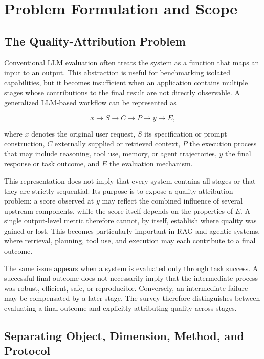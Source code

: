\section{Problem Formulation and Scope}
\label{sec:background}

\subsection{The Quality-Attribution Problem}

Conventional LLM evaluation often treats the system as a function that maps an input to an output. This abstraction is useful for benchmarking isolated capabilities, but it becomes insufficient when an application contains multiple stages whose contributions to the final result are not directly observable. A generalized LLM-based workflow can be represented as

\begin{equation}
x \rightarrow S \rightarrow C \rightarrow P \rightarrow y \rightarrow E,
\end{equation}

where $x$ denotes the original user request, $S$ its specification or prompt construction, $C$ externally supplied or retrieved context, $P$ the execution process that may include reasoning, tool use, memory, or agent trajectories, $y$ the final response or task outcome, and $E$ the evaluation mechanism.

This representation does not imply that every system contains all stages or that they are strictly sequential. Its purpose is to expose a quality-attribution problem: a score observed at $y$ may reflect the combined influence of several upstream components, while the score itself depends on the properties of $E$. A single output-level metric therefore cannot, by itself, establish where quality was gained or lost. This becomes particularly important in RAG and agentic systems, where retrieval, planning, tool use, and execution may each contribute to a final outcome.

The same issue appears when a system is evaluated only through task success. A successful final outcome does not necessarily imply that the intermediate process was robust, efficient, safe, or reproducible. Conversely, an intermediate failure may be compensated by a later stage. The survey therefore distinguishes between evaluating a final outcome and explicitly attributing quality across stages.

\subsection{Separating Object, Dimension, Method, and Protocol}


